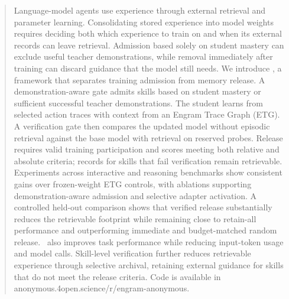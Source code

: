 \begin{abstract}
Language-model agents use experience through external retrieval and parameter learning. Consolidating stored experience into model weights requires deciding both which experience to train on and when its external records can leave retrieval. Admission based solely on student mastery can exclude useful teacher demonstrations, while removal immediately after training can discard guidance that the model still needs. We introduce \method, a framework that separates training admission from memory release. A demonstration-aware gate admits skills based on student mastery or sufficient successful teacher demonstrations. The student learns from selected action traces with context from an Engram Trace Graph (ETG). A verification gate then compares the updated model without episodic retrieval against the base model with retrieval on reserved probes. Release requires valid training participation and scores meeting both relative and absolute criteria; records for skills that fail verification remain retrievable. Experiments across interactive and reasoning benchmarks show consistent gains over frozen-weight ETG controls, with ablations supporting demonstration-aware admission and selective adapter activation. A controlled held-out comparison shows that verified release substantially reduces the retrievable footprint while remaining close to retain-all performance and outperforming immediate and budget-matched random release. \method\ also improves task performance while reducing input-token usage and model calls. Skill-level verification further reduces retrievable experience through selective archival, retaining external guidance for skills that do not meet the release criteria. Code is available in anonymous.4open.science/r/engram-anonymous.
\end{abstract}
